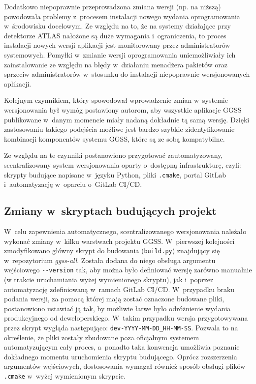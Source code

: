 Dodatkowo niepoprawnie przeprowadzona zmiana wersji (np. na niższą) powodowała problemy z~procesem instalacji nowego wydania oprogramowania w~środowisku docelowym. Ze względu na to, że na systemy działające przy detektorze ATLAS nałożone są duże wymagania i~ograniczenia, to proces instalacji nowych wersji aplikacji jest monitorowany przez administratorów systemowych. Pomyłki w~zmianie wersji oprogramowania uniemożliwiały ich zainstalowanie ze względu na błędy w~działaniu menadżera pakietów oraz sprzeciw administratorów w~stosunku do instalacji niepoprawnie wersjonowanych aplikacji.

Kolejnym czynnikiem, który spowodował wprowadzenie zmian w~systemie wersjonowania był wymóg postawiony autorom, aby wszystkie aplikacje GGSS publikowane w~danym momencie miały nadaną dokładnie tą samą wersję. Dzięki zastosowaniu takiego podejścia możliwe jest bardzo szybkie zidentyfikowanie kombinacji komponentów systemu GGSS, które są ze sobą kompatybilne.

Ze względu na te czynniki postanowiono przygotować zautomatyzowany, scentralizowany system wersjonowania oparty o~dostępną infrastrukturę, czyli: skrypty budujące napisane w~języku Python, pliki \lstinline{.cmake}, portal GitLab i~automatyzację w~oparciu o~GitLab CI/CD.

\subsection{Zmiany w~skryptach budujących projekt}
W~celu zapewnienia automatycznego, scentralizowanego wersjonowania należało wykonać zmiany w~kilku warstwach projektu GGSS. W~pierwszej kolejności zmodyfikowano główny skrypt do budowania (\lstinline{build.py}) znajdujący się w~repozytorium \emph{ggss-all}. Została dodana do niego obsługa argumentu wejściowego \lstinline{--version} tak, aby można było definiować wersję zarówno manualnie (w trakcie uruchamiania wyżej wymienionego skryptu), jak i~poprzez automatyzację zdefiniowaną w~ramach GitLab CI/CD. W~przypadku braku podania wersji, za pomocą której mają zostać oznaczone budowane pliki, postanowiono ustawiać ją tak, by możliwie łatwe było odróżnienie wydania produkcyjnego od deweloperskiego. W~takim przypadku wersja przygotowywana przez skrypt wygląda następująco: \lstinline{dev-YYYY-MM-DD_HH-MM-SS}. Pozwala to na określenie, że pliki zostały zbudowane poza oficjalnym systemem automatyzującym cały proces, a~ponadto taka konwencja umożliwia poznanie dokładnego momentu uruchomienia skryptu budującego. Oprócz rozszerzenia argumentów wejściowych, dostosowania wymagał również sposób obsługi plików \lstinline{.cmake} w~wyżej wymienionym skrypcie. 

